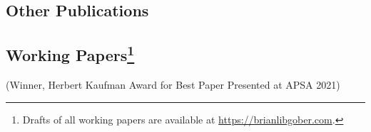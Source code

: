 \documentclass[12pt,letterpaper]{report}
\newcounter{pubcount}
\newcommand{\countthis}{%
}
\begin{document}

    \subsection*{Other Publications}
    \begin{tablist}
    \item[2026] \tab{}\countthis{}
    \item[2024] \tab{}\countthis{} 
    \item[2023] \tab{}\countthis{}
    \item[2020] \tab{}\countthis{}
    \item[2018] \tab{}\countthis{}
    \item[2015] \tab{}\countthis{}
    \end{tablist}
    
	\subsection*{Working Papers\footnote[2]{Drafts of all working papers are available at \href{https://brianlibgober.com}{https://brianlibgober.com}.}}
    \begin{tablist}
    \item[] 
    \item[] 
    \item[] 
    \item[]  (Winner, Herbert Kaufman Award for Best Paper Presented at APSA 2021)
	\item[] 
    \item[]   %
    \item[] 
    \end{tablist}
    
\end{document}
